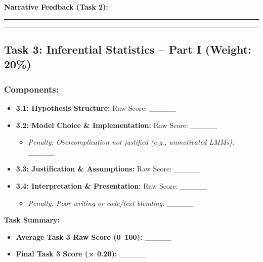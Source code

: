 \documentclass[
  10pt,
]{article}
\providecommand{\tightlist}{%
  \setlength{\itemsep}{0pt}\setlength{\parskip}{0pt}}
\begin{document}
\textbf{Narrative Feedback (Task 2):}

\begin{center}\rule{0.5\linewidth}{0.5pt}\end{center}

\begin{center}\rule{0.5\linewidth}{0.5pt}\end{center}

\subsection{Task 3: Inferential Statistics -- Part I (Weight:
20\%)}\label{task-3-inferential-statistics-part-i-weight-20}

\subsubsection{Components:}\label{components}

\begin{itemize}
\tightlist
\item
  \textbf{3.1: Hypothesis Structure:} Raw Score: \_\_\_\_\_\\
\item
  \textbf{3.2: Model Choice \& Implementation:} Raw Score: \_\_\_\_\_

  \begin{itemize}
  \tightlist
  \item
    \emph{Penalty: Overcomplication not justified (e.g., unmotivated
    LMMs):} \_\_\_\_\_\\
  \end{itemize}
\item
  \textbf{3.3: Justification \& Assumptions:} Raw Score: \_\_\_\_\_\\
\item
  \textbf{3.4: Interpretation \& Presentation:} Raw Score: \_\_\_\_\_

  \begin{itemize}
  \tightlist
  \item
    \emph{Penalty: Poor writing or code/text blending:} \_\_\_\_\_
  \end{itemize}
\end{itemize}

\textbf{Task Summary:}

\begin{itemize}
\tightlist
\item
  \textbf{Average Task 3 Raw Score (0--100):} \_\_\_\_\_\\
\item
  \textbf{Final Task 3 Score (× 0.20):} \_\_\_\_\_
\end{itemize}
\end{document}
